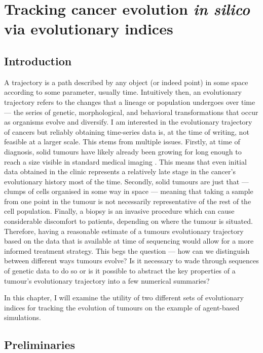 \chapter{Tracking cancer evolution \textit{in silico} via evolutionary
indices}\label{chapter:trajectories}


\section{Introduction}
A trajectory is a path described by any object (or indeed point) in some space
according to some parameter, usually time.  Intuitively then, an evolutionary
trajectory refers to the changes that a lineage or population undergoes over
time --- the series of genetic, morphological, and behavioral transformations
that occur as organisms evolve and diversify. I am interested in the
evolutionary trajectory of cancers but reliably obtaining time-series data is,
at the time of writing, not feasible at a larger scale. This stems from multiple
issues. Firstly, at time of diagnosis, solid tumours have likely already been
growing for long enough to reach a size visible in standard medical imaging
\cite{patrone_how_2011}. This means that even initial data obtained in the
clinic represents a relatively late stage in the cancer's evolutionary history
most of the time. Secondly, solid tumours are just that --- clumps of cells
organised in some way in space --- meaning that taking a sample from one point
in the tumour is not necessarily representative of the rest of the cell
population. Finally, a biopsy is an invasive procedure which can cause
considerable discomfort to patients, depending on where the tumour is situated.
Therefore, having a reasonable estimate of a tumours evolutionary trajectory
based on the data that is available at time of sequencing would allow for a more
informed treatment strategy. This begs the question --- how can we distinguish
between different ways tumours evolve? Is it necessary to wade through sequences
of genetic data to do so or is it possible to abstract the key properties of a
tumour's evolutionary trajectory into a few numerical summaries? \par In this
chapter, I will examine the utility of two different sets of evolutionary
indices for tracking the evolution of tumours on the example of agent-based
simulations.


\section{Preliminaries}

